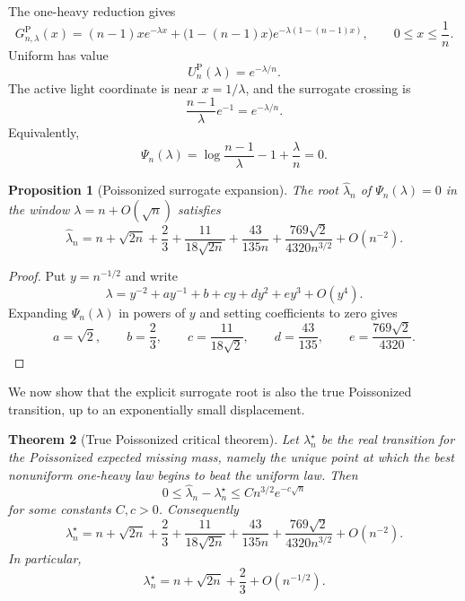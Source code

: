 \documentclass[11pt]{article}
\newtheorem{theorem}{Theorem}[section]
\newtheorem{proposition}[theorem]{Proposition}
\theoremstyle{definition}
\begin{document}
The one-heavy reduction gives
\[
  G^{\mathrm P}_{n,\lambda}(x)
  =(n-1)x e^{-\lambda x}
  +\bigl(1-(n-1)x\bigr)e^{-\lambda(1-(n-1)x)},
  \qquad 0\le x\le \frac1n .
\]
Uniform has value
\[
  U^{\mathrm P}_n(\lambda)=e^{-\lambda/n}.
\]
The active light coordinate is near $x=1/\lambda$, and the surrogate crossing is
\[
  \frac{n-1}{\lambda}e^{-1}=e^{-\lambda/n}.
\]
Equivalently,
\[
  \Psi_n(\lambda)=\log\frac{n-1}{\lambda}-1+\frac{\lambda}{n}=0.
\]

\begin{proposition}[Poissonized surrogate expansion]\label{prop:poisson-surrogate}
The root $\widehat\lambda_n$ of $\Psi_n(\lambda)=0$ in the window $\lambda=n+O(\sqrt n)$ satisfies
\[
  \widehat\lambda_n
  =n+\sqrt{2n}+\frac23+\frac{11}{18\sqrt{2n}}+\frac{43}{135n}
  +\frac{769\sqrt2}{4320n^{3/2}}+O(n^{-2}).
\]
\end{proposition}

\begin{proof}
Put $y=n^{-1/2}$ and write
\[
  \lambda=y^{-2}+ay^{-1}+b+cy+dy^2+ey^3+O(y^4).
\]
Expanding $\Psi_n(\lambda)$ in powers of $y$ and setting coefficients to zero gives
\[
  a=\sqrt2,
  \qquad b=\frac23,
  \qquad c=\frac{11}{18\sqrt2},
  \qquad d=\frac{43}{135},
  \qquad e=\frac{769\sqrt2}{4320}.
\]
\end{proof}

We now show that the explicit surrogate root is also the true Poissonized transition, up to an exponentially small displacement.

\begin{theorem}[True Poissonized critical theorem]\label{thm:true-poisson-critical}
Let $\lambda_n^\star$ be the real transition for the Poissonized expected missing mass, namely the unique point at which the best nonuniform one-heavy law begins to beat the uniform law. Then
\[
  0\le \widehat\lambda_n-\lambda_n^\star
  \le C n^{3/2}e^{-c\sqrt n}
\]
for some constants $C,c>0$. Consequently
\[
  \lambda_n^\star
  =n+\sqrt{2n}+\frac23+\frac{11}{18\sqrt{2n}}+\frac{43}{135n}
  +\frac{769\sqrt2}{4320n^{3/2}}+O(n^{-2}).
\]
In particular,
\[
  \lambda_n^\star=n+\sqrt{2n}+\frac23+O(n^{-1/2}).
\]
\end{theorem}
\end{document}
